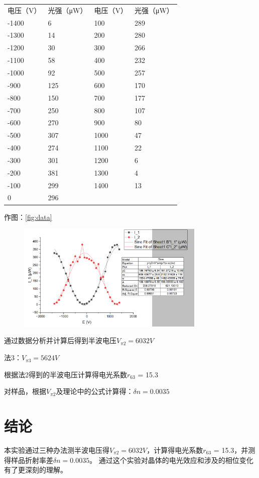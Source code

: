 \documentclass[font=default]{mpltx}
\begin{document}
\begin{table}[]
\begin{tabular}{llll}
电压（V）                      & 光强（μW）                   & 电压（V） & 光强（μW） \\
-1400                      & 6                        & 100   & 289    \\
-1300                      & 14                       & 200   & 280    \\
-1200                      & 30                       & 300   & 266    \\
-1100                      & 58                       & 400   & 232    \\
-1000                      & 92                       & 500   & 257    \\
-900                       & 125                      & 600   & 170    \\ \cline{1-2}
\multicolumn{1}{|l|}{-800} & \multicolumn{1}{l|}{150} & 700   & 177    \\ \cline{1-2}
-700                       & 250                      & 800   & 107    \\
-600                       & 270                      & 900   & 80     \\
-500                       & 307                      & 1000  & 47     \\
-400                       & 274                      & 1100  & 22     \\
-300                       & 301                      & 1200  & 6      \\
-200                       & 381                      & 1300  & 4      \\
-100                       & 299                      & 1400  & 13     \\
0                          & 296                      &       &       
\end{tabular}
\end{table}

作图：\autoref{fig:data}

\begin{figure}
  \centering
  \includegraphics[width=0.8\textwidth]{fig/data.png}
  \label{fig:data}
\end{figure}

通过数据分析并计算后得到半波电压$V_{\pi2} = 6032V$

法3：$V_{\pi3} = 5624V$

根据法2得到的半波电压计算得电光系数$r_{63}$ = 15.3

对样品，根据$V_{\pi2}$及理论中的公式计算得：$\delta n = 0.0035$


\section{结论}
本实验通过三种办法测半波电压得$V_{\pi2} = 6032V$，计算得电光系数$r_{63}$ = 15.3，并测得样品折射率差$\delta n = 0.0035$。
通过这个实验对晶体的电光效应和涉及的相位变化有了更深刻的理解。
\end{document}
